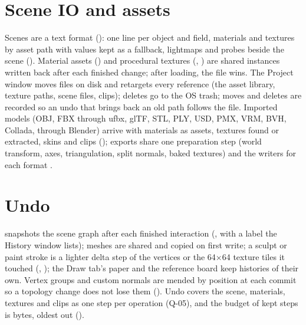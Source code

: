 \section{Scene IO and assets}
Scenes are a text format (): one line per object and field, materials and textures by
asset path with values kept as a fallback, lightmaps and probes beside the scene (). Material assets
() and procedural textures (, ) are shared instances written back after each finished
change; after loading, the file wins. The Project window moves files on disk and retargets every reference (the asset
library, texture paths, scene files, clips); deletes go to the OS trash; moves and deletes are recorded so an undo that
brings back an old path follows the file. Imported models (OBJ, FBX through ufbx, glTF, STL, PLY, USD, PMX, VRM, BVH,
Collada,  through Blender) arrive with materials as  assets, textures found or extracted, skins
and clips (); exports share one preparation step (world transform, axes, triangulation, split normals,
baked textures) and the writers for each format \cite{Khronos2021Gltf, FBXBlender2026, USD2026}.

\section{Undo}
 snapshots the scene graph after each finished interaction (, with a label the
History window lists); meshes are shared and copied on first write; a sculpt or paint stroke is a lighter delta step of
the vertices or the 64$\times$64 texture tiles it touched (, ); the Draw tab's paper and the reference
board keep histories of their own. Vertex groups and custom normals are mended by position at each commit so a
topology change does not lose them (). Undo covers the scene, materials, textures and clips as one step per
operation (Q-05), and the budget of kept steps is bytes, oldest out ().

